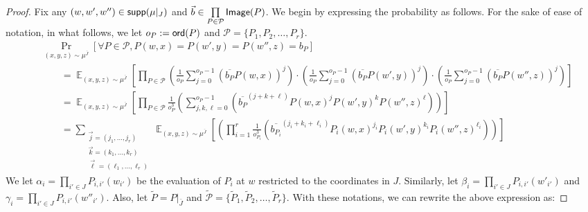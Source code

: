 \documentclass[10pt,a4paper]{amsart}
\newcommand\Prob[2]{{\Pr_{#1}\left[ {#2} \right]}}
\newcommand\Expect[2]{{\mathop{\mathbb{E}}_{#1}\left[ {#2} \right]}}
\begin{document}
    \begin{proof}
      Fix any $(w, w', w'') \in {\sf supp}(\mu|_{J})$ and $\vec{b}\in\prod\limits_{P\in\mathcal{P}}{\sf Image}(P)$. We begin by expressing the probability as follows. For the sake of ease of notation, in what follows, we let $o_P:={\sf ord}(P)$ and $\mathcal{P} = \{ P_1, P_2, \ldots, P_r\}$.
      \begin{align*}
          &\Prob{(x,y,z)\sim\mu^{\bar{J}}}{\forall P\in \mathcal{P}, P(w,x)=P(w',y)=P(w'',z) = b_P} \\
          &\quad\quad= \Expect{(x,y,z)\sim\mu^{\bar{J}}}{\prod_{P\in \mathcal{P}}\left( \frac{1}{o_P} \sum_{j=0}^{o_P-1}\left(\overline{b_P}P(w,x)\right)^j\right)\cdot \left( \frac{1}{o_P} \sum_{j=0}^{o_P-1}\left(\overline{b_P}P(w',y)\right)^j\right)\cdot \left( \frac{1}{o_P} \sum_{j=0}^{o_P-1}\left(\overline{b_P}P(w'',z)\right)^j\right)}\\
          &\quad\quad= \Expect{(x,y,z)\sim\mu^{ \bar{J}}}{\prod_{P\in \mathcal{P}} \frac{1}{o_P^3}\left(  \sum_{j, k, \ell=0}^{o_P-1}\left(\overline{b_P}^{(j+k+\ell)}P(w,x)^j P(w',y)^k P(w'',z)^\ell\right)\right)}\\
         &\quad\quad= \sum_{\substack{\vec{j} = (j_1, \ldots, j_r) \\ \vec{k} = (k_1, \ldots, k_r) \\ \vec{\ell} = (\ell_1, \ldots, \ell_r)}}\Expect{(x,y,z)\sim\mu^{\bar{J}}}{\left(  \prod_{i=1}^r \frac{1}{o_{P_i}^3}\left(\overline{b_{P_i}}^{(j_i +k_i+\ell_i)} P_i(w,x)^{j_i} P_i(w',y)^{k_i} P_i(w'',z)^{\ell_i}\right)\right)}
         \end{align*}
We let $\alpha_i = \prod_{i'\in J} P_{i,i'}(w_{i'})$ be the evaluation of $P_i$ at $w$ restricted to the coordinates in $J$. Similarly, let  $\beta_i = \prod_{i'\in J} P_{i,i'}(w'_{i'})$ and  $\gamma_i = \prod_{i'\in J} P_{i,i'}(w''_{i'})$. Also, let $\tilde{P} = P|_{\bar{J}}$ and $\tilde{\mathcal{P}} = \{ \tilde{P}_1, \tilde{P}_2, \ldots, \tilde{P}_r\}$. With these notations, we can rewrite the above expression as:


\end{proof}
\end{document}
